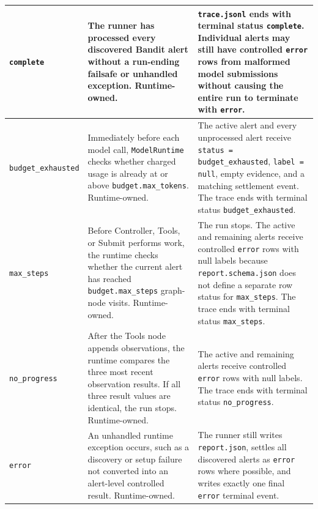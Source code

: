 \documentclass[11pt]{article}
\begin{document}
{\begin{tabular}{@{}>{\raggedright\arraybackslash}p{} >{\raggedright\arraybackslash}p{} >{\raggedright\arraybackslash}p{}@{}}
\texttt{complete} & The runner has processed every discovered Bandit alert without a run-ending failsafe or unhandled exception. Runtime-owned. & \texttt{trace.jsonl} ends with terminal status \texttt{complete}. Individual alerts may still have controlled \texttt{error} rows from malformed model submissions without causing the entire run to terminate with \texttt{error}. \\ \midrule
\texttt{budget\_}\newline\texttt{exhausted} & Immediately before each model call, \texttt{ModelRuntime} checks whether charged usage is already at or above \texttt{budget.max\_tokens}. Runtime-owned. & The active alert and every unprocessed alert receive \texttt{status = budget\_exhausted}, \texttt{label = null}, empty evidence, and a matching settlement event. The trace ends with terminal status \texttt{budget\_exhausted}. \\ \midrule
\texttt{max\_steps} & Before Controller, Tools, or Submit performs work, the runtime checks whether the current alert has reached \texttt{budget.max\_steps} graph-node visits. Runtime-owned. & The run stops. The active and remaining alerts receive controlled \texttt{error} rows with null labels because \texttt{report.schema.json} does not define a separate row status for \texttt{max\_steps}. The trace ends with terminal status \texttt{max\_steps}. \\ \midrule
\texttt{no\_progress} & After the Tools node appends observations, the runtime compares the three most recent observation results. If all three result values are identical, the run stops. Runtime-owned. & The active and remaining alerts receive controlled \texttt{error} rows with null labels. The trace ends with terminal status \texttt{no\_progress}. \\ \midrule
\texttt{error} & An unhandled runtime exception occurs, such as a discovery or setup failure not converted into an alert-level controlled result. Runtime-owned. & The runner still writes \texttt{report.json}, settles all discovered alerts as \texttt{error} rows where possible, and writes exactly one final \texttt{error} terminal event. \\
\bottomrule
\end{tabular}
}
\end{document}
